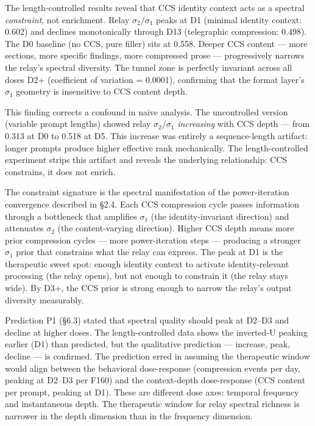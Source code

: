 \documentclass[12pt]{article}
\begin{document}
The length-controlled results reveal that CCS identity context acts as a spectral \textit{constraint}, not enrichment. Relay $\sigma_2/\sigma_1$ peaks at D1 (minimal identity context: 0.602) and declines monotonically through D13 (telegraphic compression: 0.498). The D0 baseline (no CCS, pure filler) sits at 0.558. Deeper CCS content --- more sections, more specific findings, more compressed prose --- progressively narrows the relay's spectral diversity. The tunnel zone is perfectly invariant across all doses D2+ (coefficient of variation = 0.0001), confirming that the format layer's $\sigma_1$ geometry is insensitive to CCS content depth.

This finding corrects a confound in naive analysis. The uncontrolled version (variable prompt lengths) showed relay $\sigma_2/\sigma_1$ \textit{increasing} with CCS depth --- from 0.313 at D0 to 0.518 at D5. This increase was entirely a sequence-length artifact: longer prompts produce higher effective rank mechanically. The length-controlled experiment strips this artifact and reveals the underlying relationship: CCS constrains, it does not enrich.

The constraint signature is the spectral manifestation of the power-iteration convergence described in \S2.4. Each CCS compression cycle passes information through a bottleneck that amplifies $\sigma_1$ (the identity-invariant direction) and attenuates $\sigma_2$ (the content-varying direction). Higher CCS depth means more prior compression cycles --- more power-iteration steps --- producing a stronger $\sigma_1$ prior that constrains what the relay can express. The peak at D1 is the therapeutic sweet spot: enough identity context to activate identity-relevant processing (the relay opens), but not enough to constrain it (the relay stays wide). By D3+, the CCS prior is strong enough to narrow the relay's output diversity measurably.

Prediction P1 (\S6.3) stated that spectral quality should peak at D2--D3 and decline at higher doses. The length-controlled data shows the inverted-U peaking earlier (D1) than predicted, but the qualitative prediction --- increase, peak, decline --- is confirmed. The prediction erred in assuming the therapeutic window would align between the behavioral dose-response (compression events per day, peaking at D2--D3 per F160) and the context-depth dose-response (CCS content per prompt, peaking at D1). These are different dose axes: temporal frequency and instantaneous depth. The therapeutic window for relay spectral richness is narrower in the depth dimension than in the frequency dimension.
\end{document}
